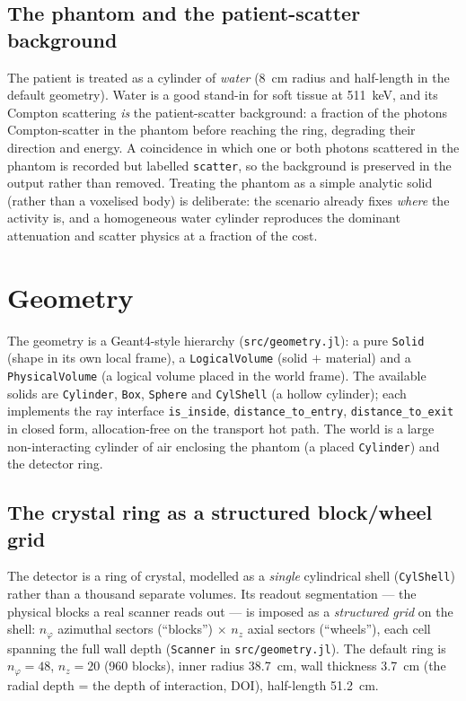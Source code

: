 \documentclass[11pt]{article}
\begin{document}
\subsection{The phantom and the patient-scatter background}
The patient is treated as a cylinder of \emph{water} (\SI{8}{cm} radius and half-length in
the default geometry). Water is a good stand-in for soft tissue at \SI{511}{keV}, and its
Compton scattering \emph{is} the patient-scatter background: a fraction of the photons
Compton-scatter in the phantom before reaching the ring, degrading their direction and
energy. A coincidence in which one or both photons scattered in the phantom is recorded but
labelled \texttt{scatter}, so the background is preserved in the output rather than removed.
Treating the phantom as a simple analytic solid (rather than a voxelised body) is
deliberate: the scenario already fixes \emph{where} the activity is, and a homogeneous water
cylinder reproduces the dominant attenuation and scatter physics at a fraction of the cost.

\section{Geometry}
\label{sec:geometry}

The geometry is a Geant4-style hierarchy (\texttt{src/geometry.jl}): a pure \texttt{Solid}
(shape in its own local frame), a \texttt{LogicalVolume} (solid $+$ material) and a
\texttt{PhysicalVolume} (a logical volume placed in the world frame). The available solids
are \texttt{Cylinder}, \texttt{Box}, \texttt{Sphere} and \texttt{CylShell} (a hollow
cylinder); each implements the ray interface \texttt{is\_inside},
\texttt{distance\_to\_entry}, \texttt{distance\_to\_exit} in closed form, allocation-free
on the transport hot path. The world is a large non-interacting cylinder of air enclosing
the phantom (a placed \texttt{Cylinder}) and the detector ring.

\subsection{The crystal ring as a structured block/wheel grid}
The detector is a ring of crystal, modelled as a \emph{single} cylindrical shell
(\texttt{CylShell}) rather than a thousand separate volumes. Its readout segmentation ---
the physical blocks a real scanner reads out --- is imposed as a \emph{structured grid} on
the shell: $n_\varphi$ azimuthal sectors (``blocks'') $\times$ $n_z$ axial sectors
(``wheels''), each cell spanning the full wall depth (\texttt{Scanner} in
\texttt{src/geometry.jl}). The default ring is $n_\varphi=48$, $n_z=20$ (\num{960} blocks),
inner radius \SI{38.7}{cm}, wall thickness \SI{3.7}{cm} (the radial depth = the depth of
interaction, DOI), half-length \SI{51.2}{cm}.
\end{document}
